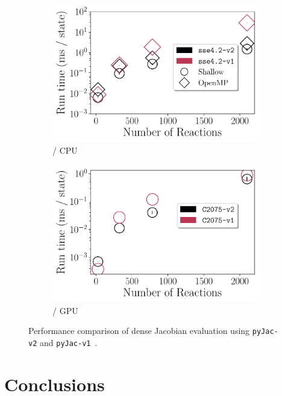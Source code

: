 \documentclass[12pt,number,sort&compress,preprint]{elsarticle}
\begin{document}
\begin{figure}[htbp]
   \centering
  \begin{subfigure}[t]{0.48\linewidth}
      \includegraphics[width=\textwidth]{v1_vs_v2.pdf}
      \caption{\sse/ CPU}
      \label{F:v1_vs_v2_cpu}
  \end{subfigure}
  \hfill
  \begin{subfigure}[t]{0.48\linewidth}
      \includegraphics[width=\textwidth]{v1_vs_v2_gpu.pdf}
      \caption{\gpuold/ GPU}
      \label{F:v1_vs_v2_gpu}
  \end{subfigure}
  \caption{Performance comparison of dense Jacobian evaluation using \texttt{pyJac-v2} and \texttt{pyJac-v1}~\cite{pyjac16}.}
  \label{F:v1_vs_v2}
\end{figure}

\section{Conclusions}
\end{document}
